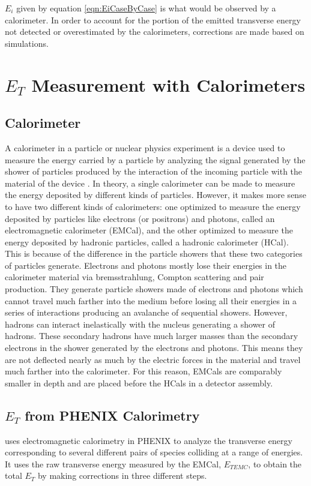 $E_{i}$ given by equation \ref{eqn:EiCaseByCase} is what would be observed by a calorimeter. In order to account for the portion of the emitted transverse energy not detected or overestimated by the calorimeters, corrections are made based on simulations.

\section{$E_{T}$ Measurement with Calorimeters}
\subsection{Calorimeter}\label{section:calorimeters}
A calorimeter in a particle or nuclear physics experiment is a device used to measure the energy carried by a particle by analyzing the signal generated by the shower of particles produced by the interaction of the incoming particle with the material of the device \cite{1674-1137-40-10-100001}. In theory, a single calorimeter can be made to measure the energy deposited by different kinds of particles. However, it makes more sense to have two different kinds of calorimeters: one optimized to measure the energy deposited by particles like electrons (or positrons) and photons, called an electromagnetic calorimeter (EMCal), and the other optimized to measure the energy deposited by hadronic particles, called a hadronic calorimeter (HCal). This is because of the difference in the particle showers that these two categories of particles generate. Electrons and photons mostly lose their energies in the calorimeter material via bremsstrahlung, Compton scattering and pair production. They generate particle showers made of electrons and photons which cannot travel much farther into the medium before losing all their energies in a series of interactions producing an avalanche of sequential showers. However, hadrons can interact inelastically with the nucleus generating a shower of hadrons. These secondary hadrons have much larger masses than the secondary electrons in the shower generated by the electrons and photons. This means they are not deflected nearly as much by the electric forces in the material and travel much farther into the calorimeter. For this reason, EMCals are comparably smaller in depth and are placed before the HCals in a detector assembly.

\subsection{$E_{T}$ from PHENIX Calorimetry}
\citet{PhysRevC.93.024901} uses electromagnetic calorimetry in PHENIX to analyze the transverse energy corresponding to several different pairs of species colliding at a range of energies. It uses the raw transverse energy measured by the EMCal, $E_{{T}EMC}$, to obtain the total $E_{T}$ by making corrections in three different steps.

